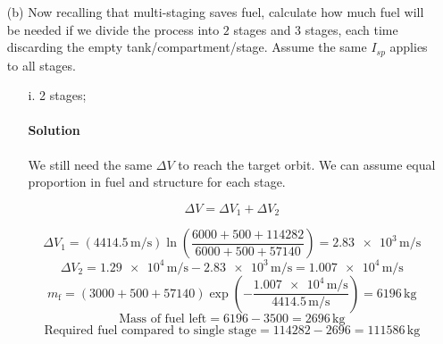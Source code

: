 \documentclass{article}
\begin{document}
{\begin{enumerate}
		\clearpage
		
		\item[(b)] Now recalling that multi-staging saves fuel, calculate how much fuel will be needed if we divide the process into $2$ stages and $3$ stages, each time discarding the empty tank/compartment/stage. Assume the same $I_{sp}$ applies to all stages. \\ 
		\begin{enumerate}
			\item[i.] 2 stages;
			\paragraph{Solution} We still need the same $\Delta V$ to reach the target orbit. We can assume equal proportion in fuel and structure for each stage.
			
			\[
				\Delta V = \Delta V_1 + \Delta V_2
			\]
			
			\[
				\Delta V_1 = (\num{4414.5} \, \unit{\meter\per\second}) \ln \left( \frac{6000 + 500 + 114282}{6000 + 500 + 57140} \right) = \num{2.83e3} \, \unit{\meter\per\second}
			\]
			\[
				\Delta V_2 = \num{1.29e4} \, \unit{\meter\per\second} - \num{2.83e3} \, \unit{\meter\per\second} = \num{1.007e4} \, \unit{\meter\per\second}
			\]
			\[
				m_\mathrm{f} = (3000 + 500 + 57140) \exp \left( -\frac{\num{1.007e4} \, \unit{\meter\per\second}}{\num{4414.5} \, \unit{\meter\per\second}} \right) = \num{6196} \, \unit{\kilogram}
			\]
			\[
				\text{Mass of fuel left} = 6196 - 3500 = \num{2696} \, \unit{\kilogram}
			\]
			\[
				\text{Required fuel compared to single stage} = 114282 - 2696 = \num{111586} \, \unit{\kilogram}
			\]
			
			

\end{enumerate}
\end{enumerate}}
\end{document}
